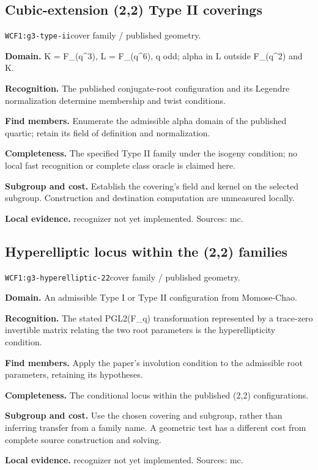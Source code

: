 \documentclass[10pt]{article}
\begin{document}
\subsection{Cubic-extension (2,2) Type II coverings}
\texttt{WCF1:g3-type-ii}\quad cover family / published geometry.\par
\textbf{Domain.} K = F\_(q\textasciicircum{}3), L = F\_(q\textasciicircum{}6), q odd; alpha in L outside F\_(q\textasciicircum{}2) and K.\par
\textbf{Recognition.} The published conjugate-root configuration and its Legendre normalization determine membership and twist conditions.\par
\textbf{Find members.} Enumerate the admissible alpha domain of the published quartic; retain its field of definition and normalization.\par
\textbf{Completeness.} The specified Type II family under the isogeny condition; no local fast recognition or complete class oracle is claimed here.\par
\textbf{Subgroup and cost.} Establish the covering's field and kernel on the selected subgroup. Construction and destination computation are unmeasured locally.\par
\textbf{Local evidence.} recognizer not yet implemented. Sources: mc.
\subsection{Hyperelliptic locus within the (2,2) families}
\texttt{WCF1:g3-hyperelliptic-22}\quad cover family / published geometry.\par
\textbf{Domain.} An admissible Type I or Type II configuration from Momose-Chao.\par
\textbf{Recognition.} The stated PGL2(F\_q) transformation represented by a trace-zero invertible matrix relating the two root parameters is the hyperellipticity condition.\par
\textbf{Find members.} Apply the paper's involution condition to the admissible root parameters, retaining its hypotheses.\par
\textbf{Completeness.} The conditional locus within the published (2,2) configurations.\par
\textbf{Subgroup and cost.} Use the chosen covering and subgroup, rather than inferring transfer from a family name. A geometric test has a different cost from complete source construction and solving.\par
\textbf{Local evidence.} recognizer not yet implemented. Sources: mc.
\end{document}
